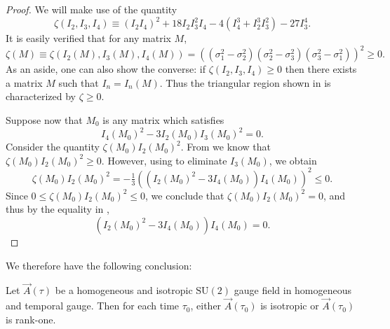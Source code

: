 \begin{proof}
We will make use of the quantity 
\[
\zeta(I_{2},I_{3},I_{4})\equiv\left(I_{2}I_{4}\right)^{2}+18I_{2}I_{3}^{2}I_{4}-4\left(I_{4}^{3}+I_{2}^{3}I_{3}^{2}\right)-27I_{3}^{4}.
\]
 It is easily verified that for any matrix $M$, 
\begin{equation}
\zeta(M)\equiv\zeta(I_{2}(M),I_{3}(M),I_{4}(M))=\left(\left(\sigma_{1}^{2}-\sigma_{2}^{2}\right)\left(\sigma_{2}^{2}-\sigma_{3}^{2}\right)\left(\sigma_{3}^{2}-\sigma_{1}^{2}\right)\right)^{2}\geq0.\label{eq:zeta-sv}
\end{equation}
 As an aside, one can also show the converse: if $\zeta(I_{2},I_{3},I_{4})\geq0$ then there exists a matrix $M$ such that $I_{n}=I_{n}(M)$. Thus the triangular region shown in  is characterized by $\zeta\geq0$. 

Suppose now that $M_{0}$ is any matrix which satisfies 
\begin{equation}
I_{4}(M_{0})^{2}-3I_{2}(M_{0})I_{3}(M_{0})^{2}=0.\label{eq:A-iso-poly}
\end{equation}
 Consider the quantity $\zeta(M_{0})I_{2}(M_{0})^{2}$. From  we know that $\zeta(M_{0})I_{2}(M_{0})^{2}\geq0$. However, using  to eliminate $I_{3}(M_{0})$, we obtain 
\begin{equation}
\zeta(M_{0})I_{2}(M_{0})^{2}=-\tfrac{1}{3}\left(\left(I_{2}(M_{0})^{2}-3I_{4}(M_{0})\right)I_{4}(M_{0})\right)^{2}\leq0.\label{eq:eliminate-I3}
\end{equation}
 Since $0\leq\zeta(M_{0})I_{2}(M_{0})^{2}\leq0$, we conclude that $\zeta(M_{0})I_{2}(M_{0})^{2}=0$, and thus by the equality in , 
\[
\left(I_{2}(M_{0})^{2}-3I_{4}(M_{0})\right)I_{4}(M_{0})=0.
\]
\end{proof}
We therefore have the following conclusion:
\begin{thm}
\label{thm:iso-or-rank-one}Let $\vec{A}(\tau)$ be a homogeneous and isotropic $\mathrm{SU}(2)$ gauge field in homogeneous and temporal gauge. Then for each time $\tau_{0}$, either $\vec{A}(\tau_{0})$ is isotropic or $\vec{A}(\tau_{0})$ is rank-one. 
\end{thm}

